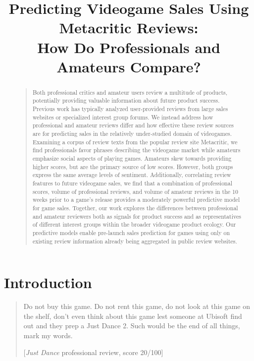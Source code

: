 \documentclass[letterpaper]{article}
\begin{document}
%
\title{Predicting Videogame Sales Using Metacritic Reviews:\\How Do Professionals and Amateurs Compare?}
\author{
}
\maketitle

\begin{abstract}
\begin{quote}
Both professional critics and amateur users review a multitude of products, potentially providing valuable information about future product success. Previous work has typically analyzed user-provided reviews from large sales websites or specialized interest group forums. We instead address how professional and amateur reviews differ and how effective these review sources are for predicting sales in the relatively under-studied domain of videogames. Examining a corpus of review texts from the popular review site Metacritic, we find professionals favor phrases describing the videogame market while amateurs emphasize social aspects of playing games. Amateurs skew towards providing higher scores, but are the primary source of low scores. However, both groups express the same average levels of sentiment.
Additionally, correlating review features to future videogame sales, we find that a combination of professional scores, volume of professional reviews, and volume of amateur reviews in the 10 weeks prior to a game's release provides a moderately powerful predictive model for game sales. Together, our work explores the differences between professional and amateur reviewers both as signals for product success and as representatives of different interest groups within the broader videogame product ecology. 
Our predictive models enable pre-launch sales prediction for games using only on existing review information already being aggregated in public review websites. %
\end{quote}
\end{abstract}


\section{Introduction}
\begin{quote}
Do not buy this game. Do not rent this game, do not look at this game on the shelf, don't even think about this game lest someone at Ubisoft find out and they prep a Just Dance 2. Such would be the end of all things, mark my words.

[\textit{Just Dance} professional review, score 20/100] %
\end{quote}
\end{document}
